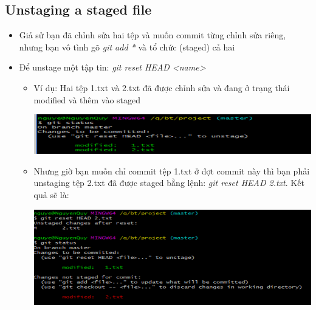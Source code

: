 \documentclass[12pt,a4paper]{report}
\begin{document}
\subsection{Unstaging a staged file}
\begin{itemize}
\item Giả sử bạn đã chỉnh sửa hai tệp và muốn commit từng chỉnh sửa riêng, nhưng bạn vô tình gõ \textit{git add *} và tổ chức (staged) cả hai
\item Để unstage một tập tin: {\it git reset HEAD <name>}
	\begin{itemize}
\item Ví dụ: Hai tệp 1.txt và 2.txt đã được chỉnh sửa và đang ở trạng thái modified và thêm vào staged

	\includegraphics[width=0.8\linewidth]{screenshot029}

	\label{fig:screenshot029}

\item Nhưng giờ bạn muốn chỉ commit tệp 1.txt ở đợt commit này thì bạn phải unstaging tệp 2.txt đã được staged bằng lệnh: {\it git reset HEAD 2.txt}. Kết quả sẽ là:

	\includegraphics[width=0.8\linewidth]{screenshot030}

	\label{fig:screenshot030}
\end{itemize}
\end{itemize}
\end{document}
